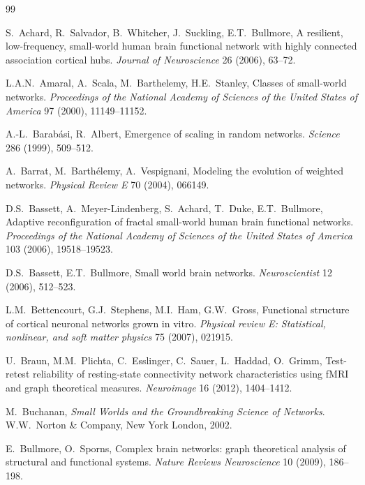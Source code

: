 \documentclass[11pt]{article}
\numberwithin{equation}{section}
\begin{document}
\begin{thebibliography}{99}

S.~Achard, R.~Salvador, B.~Whitcher, J.~Suckling, E.T.~Bullmore, 
\newblock A resilient, low-frequency, small-world human brain functional network with highly connected association cortical hubs. 
\newblock \emph{Journal of Neuroscience} 26 (2006), 63--72.

L.A.N.~Amaral, A.~Scala, M.~Barthelemy, H.E.~Stanley,
\newblock Classes of small-world networks. 
\newblock \emph{Proceedings of the National Academy of Sciences of the United States of America} 97 (2000), 11149--11152. 

A.-L.~Barab\'{a}si, R.~Albert, 
\newblock Emergence of scaling in random networks. 
\newblock \emph{Science} 286 (1999), 509--512.

A.~Barrat, M.~Barth\'{e}lemy, A.~Vespignani,
\newblock Modeling the evolution of weighted networks. 
\newblock \emph{Physical Review E} 70 (2004), 066149.

D.S.~Bassett, A.~Meyer-Lindenberg, S.~Achard, T.~Duke, E.T.~Bullmore, 
\newblock Adaptive reconfiguration of fractal small-world human brain functional networks.
\newblock \emph{Proceedings of the National Academy of Sciences of the United States of America} 103 (2006), 19518--19523.

D.S.~Bassett, E.T.~Bullmore, 
\newblock Small world brain networks. 
\newblock \emph{Neuroscientist} 12 (2006), 512--523.

L.M.~Bettencourt, G.J.~Stephens, M.I.~Ham, G.W.~Gross,
\newblock Functional structure of cortical neuronal networks grown in vitro. 
\newblock \emph{Physical review E: Statistical, nonlinear, and soft matter physics} 75 (2007), 021915.

U.~Braun, M.M.~Plichta, C.~Esslinger, C.~Sauer, L.~Haddad, O.~Grimm, 
\newblock Test-retest reliability of resting-state connectivity network characteristics using fMRI and graph theoretical measures. 
\newblock \emph{Neuroimage} 16 (2012), 1404--1412. 

M.~Buchanan, 
\newblock \emph{Small Worlds and the Groundbreaking Science of Networks}. 
\newblock W.W.~Norton \& Company, New York London, 2002.

E.~Bullmore, O.~Sporns,
\newblock Complex brain networks: graph theoretical analysis of structural and functional systems.
\newblock \emph{Nature Reviews Neuroscience} 10 (2009), 186--198.


\end{thebibliography}
\end{document}
